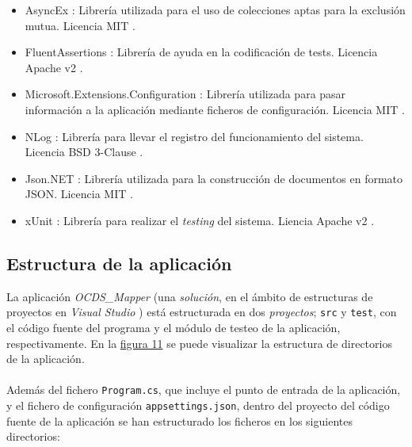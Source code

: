             \begin{itemize}
                \item AsyncEx \cite{LIBASYNC}: Librería utilizada para el uso de colecciones aptas para la exclusión mutua. Licencia MIT \cite{LICMIT}.
                \item FluentAssertions \cite{LIBASSERT}: Librería de ayuda en la codificación de tests. Licencia Apache v2 \cite{LICAPACHE}.
                \item Microsoft.Extensions.Configuration \cite{LIBCONFIG}: Librería utilizada para pasar información a la aplicación mediante ficheros de configuración. Licencia MIT \cite{LICMIT}.
                \item NLog \cite{LIBNLOG}: Librería para llevar el registro del funcionamiento del sistema. Licencia BSD 3-Clause \cite{LICBSD3}.
                \item Json.NET \cite{LIBJSON}: Librería utilizada para la construcción de documentos en formato JSON. Licencia MIT \cite{LICMIT}.
                \item xUnit \cite{LIBXUNIT}: Librería para realizar el \textit{testing} del sistema. Liencia Apache v2 \cite{LICAPACHE}.
            \end{itemize}   
    
    \subsection{Estructura de la aplicación}
        La aplicación \textit{OCDS\_Mapper} (una \textit{solución}, en el ámbito de estructuras de proyectos en \textit{Visual Studio} \cite{VSPROJSOL}) está estructurada en dos \textit{proyectos}; \texttt{src} y \texttt{test}, con el código fuente del programa y el módulo de testeo de la aplicación, respectivamente. En la \hyperref[fig:estructura]{figura 11} se puede visualizar la estructura de directorios de la aplicación.
        \\ \\
        Además del fichero \texttt{Program.cs}, que incluye el punto de entrada de la aplicación, y el fichero de configuración \texttt{appsettings.json}, dentro del proyecto del código fuente de la aplicación se han estructurado los ficheros en los siguientes directorios:
        
